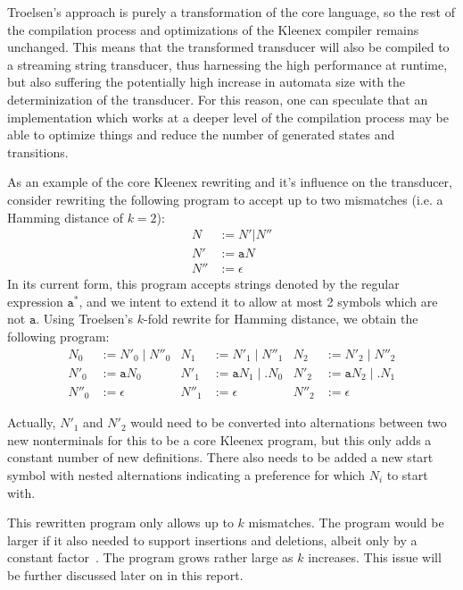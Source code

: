 Troelsen's approach is purely a transformation of the core language, so the
rest of the compilation process and optimizations of the Kleenex compiler
remains unchanged. This means that the transformed transducer will also be
compiled to a streaming string transducer, thus harnessing the high performance
at runtime, but also suffering the potentially high increase in automata size
with the determinization of the transducer. For this reason, one can speculate
that an implementation which works at a deeper level of the compilation process
may be able to optimize things and reduce the number of generated states and
transitions.


As an example of the core Kleenex rewriting and it's influence on the
transducer, consider rewriting the following program to accept up to two
mismatches (i.e. a Hamming distance of $k=2$):
\begin{align*}
  N   &:= N' | N''      \\
  N'  &:= \mathtt{a} N  \\
  N'' &:= \epsilon
\end{align*}
In its current form, this program accepts strings denoted by the regular
expression $\mathtt{a^*}$, and we intent to extend it to allow at most 2
symbols which are not $\mathtt{a}$. Using Troelsen's $k$-fold rewrite for
Hamming distance, we obtain the following program:
\begin{align*}
  N_0   &:= N'_0 \;|\; N''_0  &  N_1   &:= N'_1 \;|\; N''_1           & N_2   &:= N'_2 \;|\; N''_2           \\
  N'_0  &:= \mathtt{a} N_0    &  N'_1  &:= \mathtt{a} N_1 \;|\; . N_0 & N'_2  &:= \mathtt{a} N_2 \;|\; . N_1 \\
  N''_0 &:= \epsilon          &  N''_1 &:= \epsilon                   & N''_2 &:= \epsilon
\end{align*}

Actually, $N'_1$ and $N'_2$ would need to be converted into alternations
between two new nonterminals for this to be a core Kleenex program, but this
only adds a constant number of new definitions. There also needs to be added a
new start symbol with nested alternations indicating a preference for which
$N_i$ to start with.

This rewritten program only allows up to $k$ mismatches. The program would be
larger if it also needed to support insertions and deletions, albeit only by a
constant factor~\cite{troelsen2016approximate}. The program grows rather large
as $k$ increases. This issue will be further discussed later on in this report.



